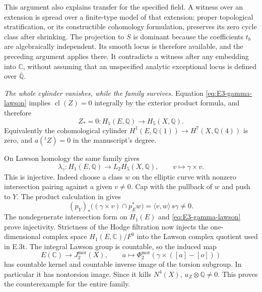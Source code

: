 This argument also explains transfer for the specified
field. A witness over an extension is spread over a
finite-type model of that extension; proper
topological stratification, or its constructible
cohomology formulation, preserves its zero cycle
class after shrinking. The projection to $S$ is
dominant because the coefficients $t_b$ are
algebraically independent. Its smooth locus is
therefore available, and the preceding argument
applies there. It contradicts a witness after any
embedding into $\mathbb C$, without assuming that
an unspecified analytic exceptional locus is
defined over $\overline{\mathbb Q}$.

\emph{The whole cylinder vanishes, while the family survives.}
Equation \eqref{eq:E3-gamma-lawson} implies
$\operatorname{cl}(Z)=0$ integrally by the exterior
product formula, and therefore
\[
 Z_*=0:H_1(E,\mathbb Q)\longrightarrow
                         H_5(X,\mathbb Q).
\]
Equivalently the cohomological cylinder
$H^1(E,\mathbb Q(1))\to H^7(X,\mathbb Q(4))$
is zero, and
$a({}^tZ)=0$ in the manuscript's degree.

On Lawson homology the same family gives
\[
 \lambda_\gamma:H_1(E,\mathbb Q)\longrightarrow
                       L_2H_5(X,\mathbb Q),
              \qquad v\longmapsto\gamma\times v.
\]
This is injective. Indeed choose a class $w$ on the
elliptic curve with nonzero intersection pairing
against a given $v\ne0$. Cap with the pullback of
$w$ and push to $Y$. The product calculation in
\citet[proof of Theorem 6.2, printed pp.~933--934]
{cyWalker2007Morphic} gives
\[
 (p_Y)_*\bigl((\gamma\times v)\cap p_E^*w\bigr)
                      =\langle v,w\rangle\,s\gamma\ne0.
\]
The nondegenerate intersection form on $H_1(E)$
and \eqref{eq:E3-gamma-lawson} prove injectivity.
Strictness of the Hodge filtration now injects the
one-dimensional complex space $H_1(E,\mathbb C)/F^0$
into the Lawson complex quotient used in E.3t.
The integral Lawson group is countable, so the
induced map
\[
 E(\mathbb C)\longrightarrow J^{\mathrm{mor}}_2(X),
           \qquad a\longmapsto
              \Phi^{\mathrm{mor}}_2(\gamma\times([a]-[o]))
\]
has countable kernel and countable inverse image
of the torsion subgroup. In particular it has
nontorsion image. Since it kills $N^4(X)$,
$u_Z\otimes\mathbb Q\ne0$. This proves the
counterexample for the entire family.

